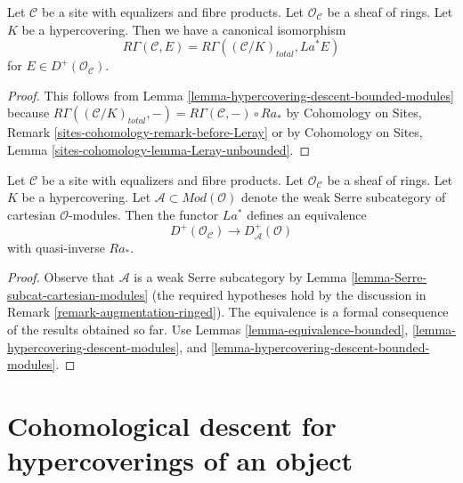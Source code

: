 \begin{lemma}
\label{lemma-compare-cohomology-hypercovering-modules}
Let $\mathcal{C}$ be a site with equalizers and fibre products.
Let $\mathcal{O}_\mathcal{C}$ be a sheaf of rings.
Let $K$ be a hypercovering.
Then we have a canonical isomorphism
$$
R\Gamma(\mathcal{C}, E) =
R\Gamma((\mathcal{C}/K)_{total}, La^*E)
$$
for $E \in D^+(\mathcal{O}_\mathcal{C})$.
\end{lemma}

\begin{proof}
This follows from Lemma \ref{lemma-hypercovering-descent-bounded-modules}
because $R\Gamma((\mathcal{C}/K)_{total}, -) =
R\Gamma(\mathcal{C}, -) \circ Ra_*$ by
Cohomology on Sites, Remark \ref{sites-cohomology-remark-before-Leray}
or by
Cohomology on Sites, Lemma \ref{sites-cohomology-lemma-Leray-unbounded}.
\end{proof}

\begin{lemma}
\label{lemma-hypercovering-equivalence-bounded-modules}
Let $\mathcal{C}$ be a site with equalizers and fibre products.
Let $\mathcal{O}_\mathcal{C}$ be a sheaf of rings.
Let $K$ be a hypercovering.
Let $\mathcal{A} \subset \textit{Mod}(\mathcal{O})$
denote the weak Serre subcategory of cartesian $\mathcal{O}$-modules.
Then the functor $La^*$ defines an equivalence
$$
D^+(\mathcal{O}_\mathcal{C}) \longrightarrow D_\mathcal{A}^+(\mathcal{O})
$$
with quasi-inverse $Ra_*$.
\end{lemma}

\begin{proof}
Observe that $\mathcal{A}$ is a weak Serre subcategory by
Lemma \ref{lemma-Serre-subcat-cartesian-modules}
(the required hypotheses hold by the discussion in
Remark \ref{remark-augmentation-ringed}).
The equivalence is a
formal consequence of the results obtained so far. Use
Lemmas \ref{lemma-equivalence-bounded},
\ref{lemma-hypercovering-descent-modules}, and
\ref{lemma-hypercovering-descent-bounded-modules}.
\end{proof}






\section{Cohomological descent for hypercoverings of an object}
\label{section-cohomological-descent-hypercoverings-X}

